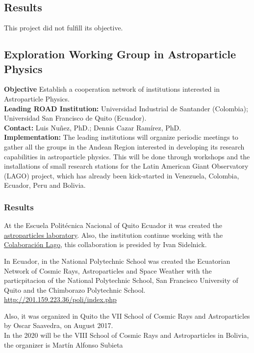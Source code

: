 \subsection{Results}
This project did not fulfill its objective.


\subsection{Exploration Working Group in Astroparticle Physics}
\textbf{Objective} Establish a cooperation network of institutions interested in Astroparticle Physics.
\\
\textbf{Leading ROAD Institution:} Universidad Industrial de Santander (Colombia); Universidad San Francisco de Quito (Ecuador). 
\\
\textbf{Contact:} Luis Nuñez, PhD.; Dennis Cazar Ramírez, PhD.
\\
\textbf{Implementation:} The leading institutions will organize periodic meetings to gather all the groups in the Andean Region interested in developing its research capabilities in astroparticle physics. This will be done through workshops and the installations of small research stations for the Latin American Giant Observatory (LAGO) project, which has already been kick-started in Venezuela, Colombia, Ecuador, Peru and Bolivia.

\subsubsection{Results}
At the Escuela Politécnica Nacional of Quito Ecuador it was created the \href{http://201.159.223.36/poli/index.php}{astroparticles laboratory}. Also, the institution continue working with the \href{http://lagoproject.net/}{Colaboración Lago}, this collaboration is presided by Ivan Sidelnick. %

In Ecuador, in the National Polytechnic School was created the Ecuatorian Network of Cosmic Rays, Astroparticles and Space Weather with the particpitacion of the National Polytechnic School, San Francisco University of Quito and the Chimborazo Polytechnic School. \href{Astroparticle Laboratory of the  National Polytechnic School}{http://201.159.223.36/poli/index.php}

Also, it was organized in Quito the VII School of Cosmic Rays and Astroparticles by Oscar Saavedra, on August 2017.
\\
In the 2020 will be the VIII School of Cosmic Rays and Astroparticles in Bolivia, the organizer is Martín Alfonso Subieta %


